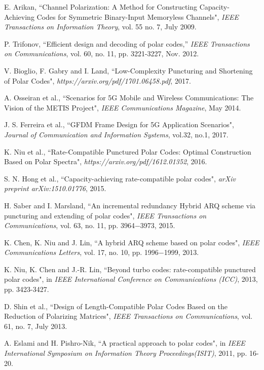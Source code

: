 \documentclass[10pt,twocolumn]{IEEEtran}
\begin{document}
\begin{thebibliography}{99}

E. Arikan, ``Channel Polarization: A Method for Constructing
Capacity-Achieving Codes for Symmetric Binary-Input Memoryless
Channels", \textit{IEEE Transactions on Information Theory}, vol. 55
no. 7, July 2009.

P. Trifonov, ``Efficient design and decoding of polar codes,''
\textit{IEEE Transactions on Communications}, vol. 60, no. 11, pp.
3221-3227, Nov. 2012.

V. Bioglio, F. Gabry and I. Land, ``Low-Complexity Puncturing and Shortening of Polar Codes",
\textit{https://arxiv.org/pdf/1701.06458.pdf}, 2017.

A. Osseiran et al., ``Scenarios for 5G Mobile and Wireless
Communications: The Vision of the METIS Project", \textit{IEEE
Communications Magazine}, May 2014.

J. S. Ferreira et al., ``GFDM Frame Design for 5G Application
Scenarios", \textit{Journal of Communication and Information
Systems}, vol.32, no.1, 2017.

K. Niu et al., ``Rate-Compatible Punctured Polar Codes: Optimal
Construction Based on Polar Spectra",
\textit{https://arxiv.org/pdf/1612.01352}, 2016.

S. N. Hong et al., ``Capacity-achieving rate-compatible polar
codes", \textit{arXiv preprint arXiv:1510.01776}, 2015.

H. Saber and I. Marsland, ``An incremental redundancy Hybrid ARQ
scheme via puncturing and extending of polar codes", \textit{IEEE
Transactions on Communications}, vol. 63, no. 11, pp. 3964$-$3973,
2015.

K. Chen, K. Niu and J. Lin, ``A hybrid ARQ scheme based on polar
codes", \textit{IEEE Communications Letters}, vol. 17, no. 10, pp.
1996$-$1999, 2013.

K. Niu, K. Chen and J.-R. Lin, ``Beyond turbo codes: rate-compatible
punctured polar codes", in \textit{IEEE International Conference on
Communications (ICC)}, 2013, pp. 3423-3427.

D. Shin et al., ``Design of Length-Compatible Polar Codes Based on
the Reduction of Polarizing Matrices", \textit{IEEE Transactions on
Communications}, vol. 61, no. 7, July 2013.

A. Eslami and H. Pishro-Nik, ``A practical approach to polar codes",
in \textit{IEEE International Symposium on Information Theory
Proceedings(ISIT)}, 2011, pp. 16-20.


\end{thebibliography}
\end{document}
